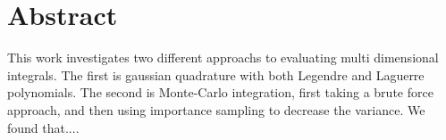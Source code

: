 \section*{Abstract}
This work investigates two different approachs to evaluating multi dimensional
integrals. The first is gaussian quadrature with both Legendre and Laguerre
polynomials. The second is Monte-Carlo integration, first taking a brute force
approach, and then using importance sampling to decrease the variance.
We found that....
